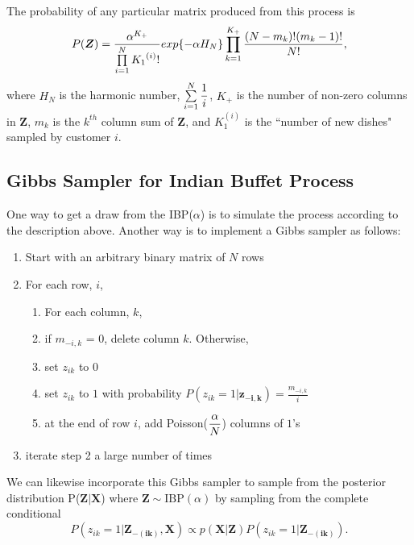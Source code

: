 \noindent
The probability of any particular matrix produced from this process is
\begin{equation}
  P(\bm{Z}) = \frac{\alpha^{K_+}}{\prod\limits_{i=1}^{N} {K_1}^{(i)}!} 
              exp\{-\alpha H_N\}\prod\limits_{k=1}^{K_+}
              \frac{(N-m_k)!(m_k-1)!}{N!},
\end{equation}
where $H_N$ is the harmonic number, $\sum\limits_{i=1}^{N}\displaystyle\frac{1}{i}$, $K_+$ is
the number of non-zero columns in $\bm Z$, $m_k$ is the $k^{th}$ column sum of
$\bm Z$, and $K_1^{(i)}$ is the ``number of new dishes" sampled by customer $i$.\\

\subsection{Gibbs Sampler for Indian Buffet Process}
One way to get a draw from the IBP($\alpha$) is to simulate the process according to 
the description above. Another way is to implement a Gibbs sampler as follows:

\begin{enumerate}
  \item Start with an arbitrary binary matrix of $N$ rows
  \item For each row, $i$,
  \begin{enumerate}
    \item For each column, $k$,
    \item if $m_{-i,k}$ = $0$, delete column $k$. Otherwise,
    \item set $z_{ik}$ to $0$
    \item set $z_{ik}$ to $1$ with probability $P(z_{ik}=1|\bm{z_{-i,k}}) = \frac{m_{-i,k}}{i}$
    \item at the end of row $i$, add Poisson($\displaystyle\frac{\alpha}{N}$) columns of $1$'s
  \end{enumerate}
  \item iterate step 2 a large number of times
\end{enumerate}
We can likewise incorporate this Gibbs sampler to sample from the posterior distribution P($\bm{Z|X}$)
where $\bm Z \sim \text{IBP}(\alpha)$ by sampling from the complete conditional
\begin{equation}
  P(z_{ik}=1|\bm{Z_{-(ik)},X})  \propto p(\bm{X|Z}) P(z_{ik}=1|\bm{Z_{-(ik)}}).
\end{equation}\\


